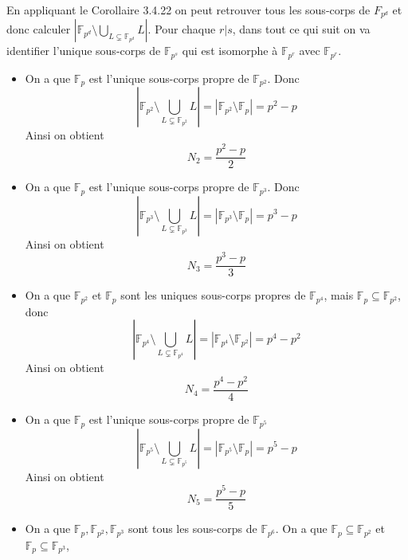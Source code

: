 \documentclass{article}
\newcommand{\F}{\mathbb{F}}
\begin{document}
En appliquant le Corollaire 3.4.22 on peut retrouver tous les
sous-corps de $F_{p^d}$ et donc calculer $|\F_{p^d}\setminus
\bigcup_{L \subsetneq \F_{p^d}}L|$. Pour chaque $r|s$,
dans tout ce qui suit on
va identifier l'unique sous-corps de $\F_{p^s}$ qui est isomorphe
à $\F_{p^r}$ avec $\F_{p^r}$.

\begin{itemize}
	\item On a que $\F_{p}$ est l'unique sous-corps propre
		de $\F_{p^2}$. Donc
		\begin{equation*}
			|\F_{p^2}\setminus
			\bigcup_{L \subsetneq \F_{p^2}}L|
			= |\F_{p^2} \setminus \F_p| = p^2 - p
		\end{equation*}
		Ainsi on obtient
		\begin{equation*}
			N_2 = \frac{p^2 - p}{2}
		\end{equation*}
	\item On a que $\F_{p}$ est l'unique sous-corps propre
		de $\F_{p^3}$. Donc
		\begin{equation*}
			|\F_{p^3}\setminus
			\bigcup_{L \subsetneq \F_{p^3}}L| =
			|\F_{p^3} \setminus \F_p| = p^3 - p
		\end{equation*}
		Ainsi on obtient
		\begin{equation*}
			N_3 = \frac{p^3 - p}{3}
		\end{equation*}
	\item On a que $\F_{p^2}$ et $\F_{p}$ sont les uniques
		sous-corps propres de $\F_{p^4}$,
		mais $\F_p \subseteq \F_{p^2}$, donc 
		\begin{equation*}
			|\F_{p^4}\setminus
			\bigcup_{L \subsetneq \F_{p^4}}L| =
			|\F_{p^4} \setminus \F_{p^2}| = p^4 - p^2
		\end{equation*}
		Ainsi on obtient
		\begin{equation*}
			N_4 = \frac{p^4 - p^2}{4}
		\end{equation*}
	\item On a que $\F_{p}$ est l'unique sous-corps propre
		de $\F_{p^5}$	
		\begin{equation*}
			|\F_{p^5}\setminus
			\bigcup_{L \subsetneq \F_{p^5}}L| =
			|\F_{p^5} \setminus \F_p| = p^5 - p
		\end{equation*}
		Ainsi on obtient
		\begin{equation*}
			N_5 = \frac{p^5 - p}{5}
		\end{equation*}
	\item On a que $\F_{p}, \F_{p^2}, \F_{p^3}$ sont tous les
		sous-corps de $\F_{p^6}$. On a que 
		$\F_{p} \subseteq \F_{p^2}$ et $\F_{p} \subseteq \F_{p^3}$,

\end{itemize}
\end{document}

